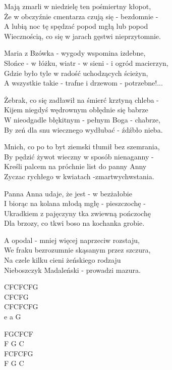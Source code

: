 \begin{text}
    Mają zmarli w niedzielę ten pośmiertny kłopot,\\
    Że w obczyźnie cmentarza czują się - bezdomnie -\\
    A lubią noc tę spędzać popod mgłą lub popod\\
    Wiecznością, co się w jarach gęstwi nieprzytomnie.

    Maria z Bzówka - wygody wspomina izdebne,\\
    Słońce - w łóżku, wiatr - w sieni - i ogród macierzyn,\\
    Gdzie było tyle w radość uchodzących ścieżyn,\\
    A wszystkie takie - trafne i drzewom - potrzebne!...

    Żebrak, co się zadławił na śmierć krztyną chleba -\\
    Kijem niegdyś wędrownym obłędnie się babrze\\
    W nieodgadle błękitnym - pełnym Boga - chabrze,\\
    By zeń dla snu wiecznego wydłubać - źdźbło nieba.

    Mnich, co po to byt ziemski tłumił bez szemrania,\\
    By pędzić żywot wieczny w sposób nienaganny -\\
    Kreśli palcem na próchnie list do panny Anny\\
    Zyczac rychłego w kwiatach -zmartwychwstania.

    Panna Anna udaje, że jest - w bezżałobie\\
    I biorąc na kolana młodą mgłę - pieszczochę -\\
    Ukradkiem z pajęczyny tka zwiewną pończochę\\
    Dla brzozy, co tkwi boso na kochanka grobie.

    A opodal - mniej więcej naprzeciw rozstaju,\\
    We fraku bezrozumnie skąsanym przez szczura,\\
    Na czele kilku cieni żeńskiego rodzaju\\
    Nieboszczyk Madaleński - prowadzi mazura.
\end{text}
\begin{chord}
    CFCFCFG\\
    CFCFG\\
    CFCFCFG\\
    e a G

    FGCFCF\\
    F G C\\
    FCFCFG\\
    F G C
\end{chord}